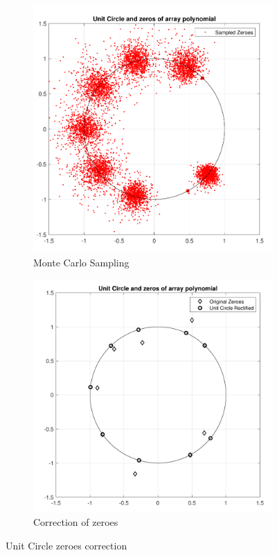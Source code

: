 \documentclass[12pt]{article}
\begin{document}
\begin{figure}[H]
    \centering
    \begin{subfigure}[b]{0.4\linewidth}
        \includegraphics[width=.9\linewidth]{paper/figures/uc_monte_carlo.pdf}
        \caption{Monte Carlo Sampling}
        \label{fig:uc_monte_carlo}
    \end{subfigure}\hspace{0.09\linewidth}
    \begin{subfigure}[b]{0.4\linewidth}
        \includegraphics[width=.9\linewidth]{paper/figures/uc_corrected.pdf}
        \caption{Correction of zeroes}
        \label{fig:uc_corrected}
    \end{subfigure}
    \caption{Unit Circle zeroes correction}
    \label{fig:uc_plots}
\end{figure}
\end{document}
